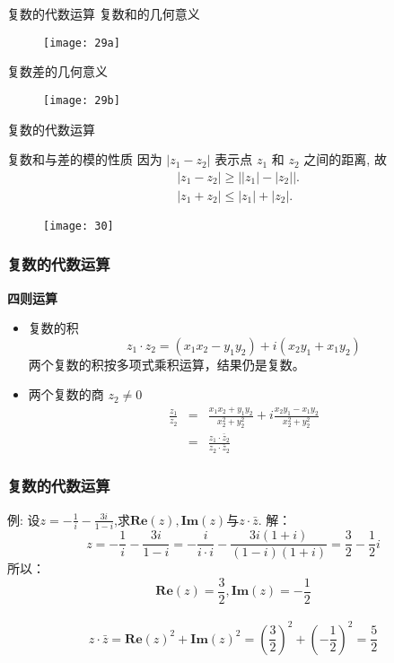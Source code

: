 \documentclass{beamer}
\begin{document}
\begin{frame}{复数的代数运算}
复数和的几何意义
\begin{figure}
\texttt{[image: 29a]}
\end{figure}
复数差的几何意义
\begin{figure}
	\texttt{[image: 29b]}
\end{figure}
\end{frame}
\begin{frame}{复数的代数运算}
\begin{block}{复数和与差的模的性质}
因为 $ \left| {{z_1} - {z_2}} \right| $ 表示点 $ {z_1} $ 和 $ {z_2} $ 之间的距离, 故
\begin{align*}
&\left| {{z_1} - {z_2}} \right| \ge \left| {\left| {{z_1}} \right| - \left| {{z_2}} \right|} \right|.\\
&\left| {{z_1} + {z_2}} \right| \le \left| {{z_1}} \right| + \left| {{z_2}} \right|.
\end{align*}
\begin{figure}
\texttt{[image: 30]}
\end{figure}
\end{block}
\end{frame}

\begin{frame}[t]
\frametitle{复数的代数运算}
\textbf{四则运算}

\begin{itemize}

\item 复数的积
$$z_1 \cdot z_2 = (x_1x_2 - y_1y_2) + i (x_2y_1 +x_1y_2)$$
两个复数的积按多项式乘积运算，结果仍是复数。
\item 两个复数的商  $z_2 \neq  0$
\begin{eqnarray}
\frac{z_1}{z_2} &=& \frac{x_1x_2+y_1y_2}{x_2^2+y_2^2}+i\frac{x_2y_1-x_1y_2}{x_2^2+y_2^2} \nonumber \\
&=& \frac{z_1\cdot \bar{z}_2}{z_2 \cdot \bar{z}_2} \nonumber
\end{eqnarray}

\end{itemize}
\end{frame}

\begin{frame}
\frametitle{复数的代数运算}
\begin{exampleblock}{例: 设$z = -\frac{1}{i} - \frac{3i}{1-i}$,求$\mathbf{Re}(z), \mathbf{Im}(z)$与$z\cdot\bar{z}.$}
解： 
$$ z = -\frac{1}{i} - \frac{3i}{1-i} = -\frac{i}{i\cdot i} - \frac{3i(1+i)}{(1-i)(1+i)}= \frac{3}{2}-\frac{1}{2}i $$
所以：\\
$$\mathbf{Re}(z) = \frac{3}{2}, \mathbf{Im}(z) = -\frac{1}{2}$$\\
$$z\cdot\bar{z}  =  {\mathbf{Re}(z)}^2 + {\mathbf{Im}(z)}^2
= {\left (\frac{3}{2} \right )}^2+{\left (-\frac{1}{2}\right)}^2=\frac{5}{2}$$
\end{exampleblock} 

\end{frame}
\end{document}
